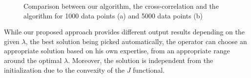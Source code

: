 \documentclass[]{elsarticle} %
\begin{document}
\begin{figure}[H]
    \centering
    \caption{Comparison between our algorithm, the cross-correlation and the~\cite{Z_Hydro_Cirpka2007} algorithm for 1000 data points (a) and 5000 data points (b)}
    \label{fig_comparison_to_xcorr_cirpka}
\end{figure}

While our proposed approach  provides different output results depending on the given $\lambda$, the best solution being picked automatically, the operator can choose an appropriate solution based on his own expertise, from an appropriate range around the optimal $\lambda$. Moreover, the solution is independent from the initialization due to the convexity of the $J$ functional. 
\end{document}
